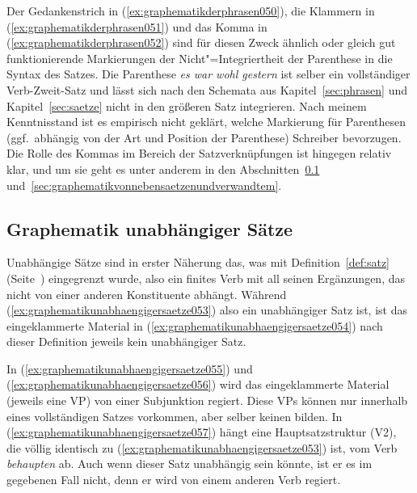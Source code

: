 Der Gedankenstrich in (\ref{ex:graphematikderphrasen050}), die Klammern in (\ref{ex:graphematikderphrasen051}) und das Komma in (\ref{ex:graphematikderphrasen052}) sind für diesen Zweck ähnlich oder gleich gut funktionierende Markierungen der Nicht"=Integriertheit der Parenthese in die Syntax des Satzes.
Die Parenthese \textit{es war wohl gestern} ist selber ein vollständiger Verb-Zweit-Satz und lässt sich nach den Schemata aus Kapitel~\ref{sec:phrasen} und Kapitel~\ref{sec:saetze} nicht in den größeren Satz integrieren.
Nach meinem Kenntnisstand ist es empirisch nicht geklärt, welche Markierung für Parenthesen (ggf.\ abhängig von der Art und Position der Parenthese) Schreiber bevorzugen.
Die Rolle des Kommas im Bereich der Satzverknüpfungen ist hingegen relativ klar, und um sie geht es unter anderem in den Abschnitten~\ref{sec:graphematikunabhaengigersaetze} und~\ref{sec:graphematikvonnebensaetzenundverwandtem}.

\subsection{Graphematik unabhängiger Sätze}
\label{sec:graphematikunabhaengigersaetze}

Unabhängige Sätze sind in erster Näherung das, was mit Definition~\ref{def:satz} (Seite~\pageref{def:satz}) eingegrenzt wurde, also ein finites Verb mit all seinen Ergänzungen, das nicht von einer anderen Konstituente abhängt.
Während (\ref{ex:graphematikunabhaengigersaetze053}) also ein unabhängiger Satz ist, ist das eingeklammerte Material in (\ref{ex:graphematikunabhaengigersaetze054}) nach dieser Definition jeweils kein unabhängiger Satz.

\begin{exe}
  \ex\label{ex:graphematikunabhaengigersaetze054}
  \begin{xlist}
  \end{xlist}
\end{exe}

In (\ref{ex:graphematikunabhaengigersaetze055}) und (\ref{ex:graphematikunabhaengigersaetze056}) wird das eingeklammerte Material (jeweils eine VP) von einer Subjunktion regiert.
Diese VPs können nur innerhalb eines vollständigen Satzes vorkommen, aber selber keinen bilden.
In (\ref{ex:graphematikunabhaengigersaetze057}) hängt eine Hauptsatzstruktur (V2), die völlig identisch zu (\ref{ex:graphematikunabhaengigersaetze053}) ist, vom Verb \textit{behaupten} ab.
Auch wenn dieser Satz unabhängig sein könnte, ist er es im gegebenen Fall nicht, denn er wird von einem anderen Verb regiert.

